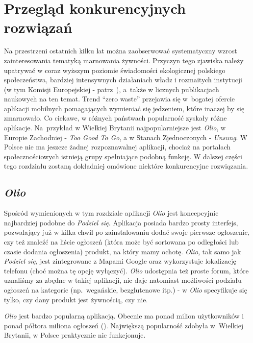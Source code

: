 \documentclass[licencjacka]{pracamgr}
\begin{document}
\chapter{Przegląd konkurencyjnych rozwiązań}\label{r:konkurencja}

Na przestrzeni ostatnich kilku lat można zaobserwować systematyczny wzrost zainteresowania tematyką marnowania żywności. Przyczyn tego zjawiska należy upatrywać w coraz wyższym poziomie świadomości ekologicznej polskiego społeczeństwa, bardziej intensywnych działaniach władz i rozmaitych instytucji (w tym Komisji Europejskiej - patrz~\cite{ec}), a~także w licznych publikacjach naukowych na ten temat. Trend ``zero waste'' przejawia się w~bogatej ofercie aplikacji mobilnych pomagających wymieniać się jedzeniem, które inaczej by się zmarnowało. Co ciekawe, w różnych państwach popularność zyskały różne aplikacje. Na~przykład w Wielkiej Brytanii najpopularniejsze jest \textit{Olio}, w Europie Zachodniej - \textit{Too Good To Go}, a w Stanach Zjednoczonych - \textit{Unsung}. W Polsce nie ma jeszcze żadnej rozpoznawalnej aplikacji, chociaż na portalach społecznościowych istnieją grupy spełniające podobną funkcję. W dalszej części tego rozdziału zostaną dokładniej omówione niektóre konkurencyjne rozwiązania.

\section{\textit{Olio}}
Spośród wymienionych w tym rozdziale aplikacji \textit{Olio} jest koncepcyjnie najbardziej podobne do \textit{Podziel się}. Aplikacja posiada bardzo prosty interfejs, pozwalający już w kilka chwil po zainstalowaniu dodać swoje pierwsze ogłoszenie, czy też znaleźć na liście ogłoszeń (która może być sortowana po odległości lub czasie dodania ogłoszenia) produkt, na który mamy ochotę. \textit{Olio}, tak samo jak \textit{Podziel się}, jest zintegrowane z Mapami Google oraz wykorzystuje lokalizację telefonu (choć można tę opcję wyłączyć). \textit{Olio} udostępnia też proste forum, które uznaliśmy za zbędne w takiej aplikacji, nie daje natomiast możliwości podziału ogłoszeń na kategorie (np.\ wegańskie, bezglutenowe itp.) - w \textit{Olio} specyfikuje się tylko, czy dany produkt jest żywnością, czy nie.

\textit{Olio} jest bardzo popularną aplikacją. Obecnie ma ponad milion użytkowników i ponad półtora miliona ogłoszeń (\cite{olio}). Największą popularność zdobyła w~Wielkiej Brytanii, w Polsce praktycznie nie funkcjonuje.
\end{document}
